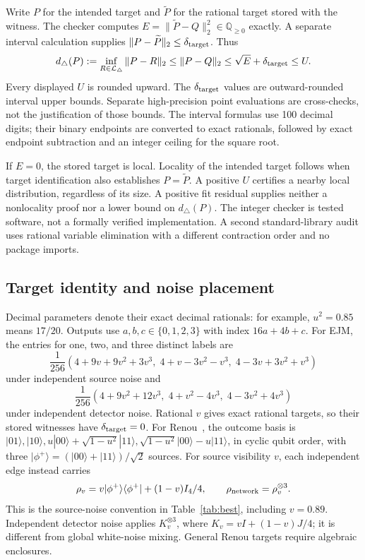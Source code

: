\documentclass[10pt]{article}
\begin{document}
Write $P$ for the intended target and $\widetilde P$ for the rational target
stored with the witness. The checker computes
$E=\|\widetilde P-Q\|_2^2\in\mathbb Q_{\ge0}$ exactly. A separate interval
calculation supplies $\|P-\widetilde P\|_2\le\delta_{\rm target}$. Thus
\begin{equation}
 d_\triangle(P):=\inf_{R\in\mathcal L_\triangle}\|P-R\|_2
 \le\|P-Q\|_2\le\sqrt E+\delta_{\rm target}\le U.\label{eq:bound}
\end{equation}
Every displayed $U$ is rounded upward. The $\delta_{\rm target}$ values are
outward-rounded interval upper bounds. Separate high-precision point
evaluations are cross-checks, not the justification of those bounds. The
interval formulas use 100 decimal digits; their binary endpoints are converted
to exact rationals, followed by exact endpoint subtraction and an integer
ceiling for the square root.

If $E=0$, the stored target is local. Locality of the intended target follows
when target identification also establishes $P=\widetilde P$. A positive $U$
certifies a nearby local distribution, regardless of its size. A positive fit
residual supplies neither a nonlocality proof nor a lower bound on
$d_\triangle(P)$. The integer checker is tested software, not a formally
verified implementation. A second standard-library audit uses rational
variable elimination with a different contraction order and no package imports.

\subsection*{Target identity and noise placement}
Decimal parameters denote their exact decimal rationals: for example,
$u^2=0.85$ means $17/20$. Outputs use $a,b,c\in\{0,1,2,3\}$ with index
$16a+4b+c$. For EJM, the entries for one, two, and three distinct labels are
\[
 \frac1{256}(4+9v+9v^2+3v^3,\;4+v-3v^2-v^3,\;4-3v+3v^2+v^3)
\]
under independent source noise and
\[
 \frac1{256}(4+9v^2+12v^3,\;4+v^2-4v^3,\;4-3v^2+4v^3)
\]
under independent detector noise. Rational $v$ gives exact rational targets,
so their stored witnesses have $\delta_{\rm target}=0$.
For Renou~\cite{renou}, the outcome basis is
$|01\rangle,|10\rangle,u|00\rangle+\sqrt{1-u^2}|11\rangle,
\sqrt{1-u^2}|00\rangle-u|11\rangle$, in cyclic qubit order, with three
$|\phi^+\rangle=(|00\rangle+|11\rangle)/\sqrt2$ sources. For source
visibility $v$, each independent edge instead carries
\[
 \rho_v=v|\phi^+\rangle\langle\phi^+|+(1-v)I_4/4,
 \qquad \rho_{\rm network}=\rho_v^{\otimes3}.
\]
This is the source-noise convention in Table~\ref{tab:best}, including $v=0.89$.
Independent detector noise applies
$K_v^{\otimes3}$, where $K_v=vI+(1-v)J/4$; it is different from global
white-noise mixing. General Renou targets require algebraic enclosures.
\end{document}
